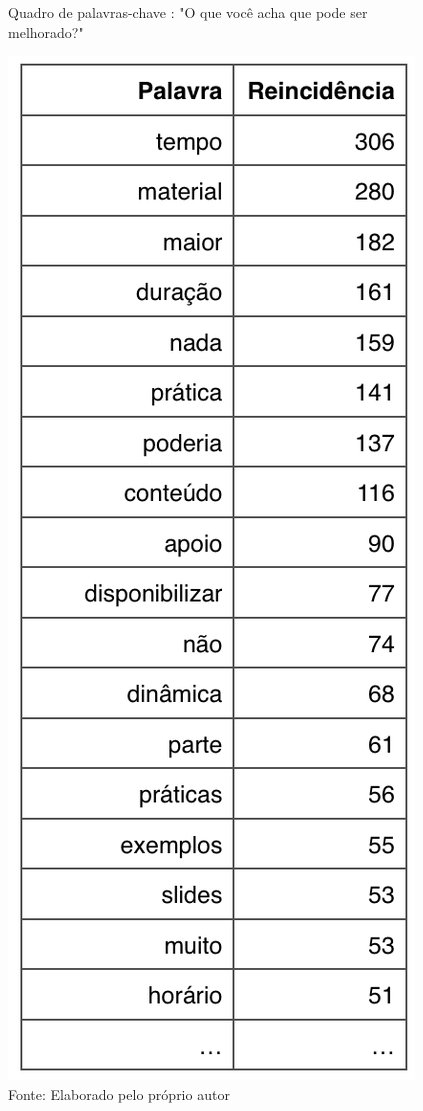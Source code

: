 \begin{figure}[H]
\caption{Quadro de palavras-chave : "O que você acha que pode ser melhorado?"}
\centerline{\includegraphics[scale=0.75]{img/melhoriastopn}}
\label{fig:melhoriastopn}
\caption* {Fonte: Elaborado pelo próprio autor}
\end{figure}

